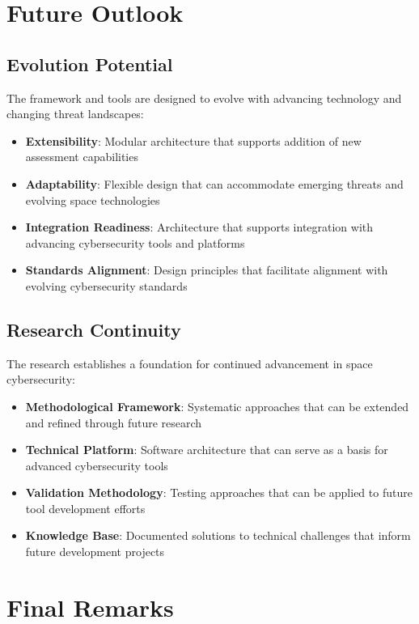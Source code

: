 \documentclass[binding=0.6cm]{sapthesis}
\begin{document}
\section{Future Outlook}

\subsection{Evolution Potential}

The framework and tools are designed to evolve with advancing technology and changing threat landscapes:

\begin{itemize}
    \item \textbf{Extensibility}: Modular architecture that supports addition of new assessment capabilities
    \item \textbf{Adaptability}: Flexible design that can accommodate emerging threats and evolving space technologies
    \item \textbf{Integration Readiness}: Architecture that supports integration with advancing cybersecurity tools and platforms
    \item \textbf{Standards Alignment}: Design principles that facilitate alignment with evolving cybersecurity standards
\end{itemize}

\subsection{Research Continuity}

The research establishes a foundation for continued advancement in space cybersecurity:

\begin{itemize}
    \item \textbf{Methodological Framework}: Systematic approaches that can be extended and refined through future research
    \item \textbf{Technical Platform}: Software architecture that can serve as a basis for advanced cybersecurity tools
    \item \textbf{Validation Methodology}: Testing approaches that can be applied to future tool development efforts
    \item \textbf{Knowledge Base}: Documented solutions to technical challenges that inform future development projects
\end{itemize}

\section{Final Remarks}
\end{document}
